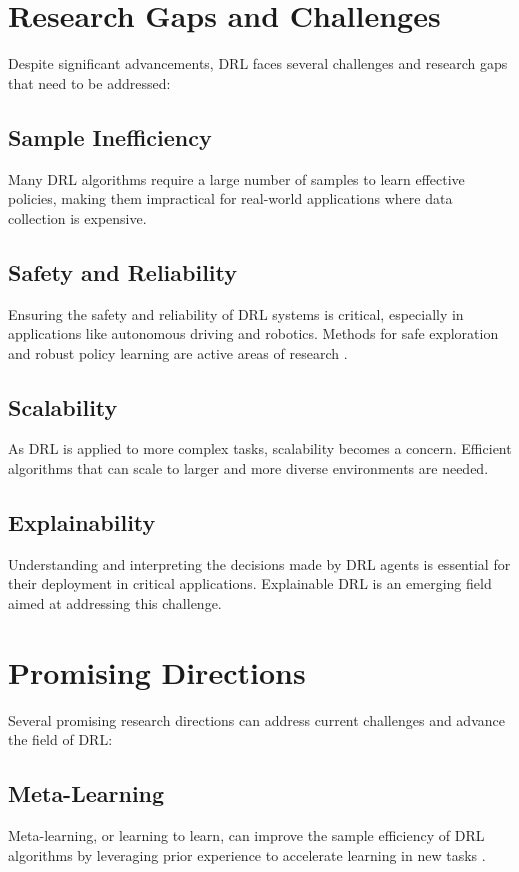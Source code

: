 \documentclass{article}
\begin{document}
\section{Research Gaps and Challenges}
Despite significant advancements, DRL faces several challenges and research gaps that need to be addressed:

\subsection{Sample Inefficiency}
Many DRL algorithms require a large number of samples to learn effective policies, making them impractical for real-world applications where data collection is expensive.

\subsection{Safety and Reliability}
Ensuring the safety and reliability of DRL systems is critical, especially in applications like autonomous driving and robotics. Methods for safe exploration and robust policy learning are active areas of research \cite{sharma2023deep}.

\subsection{Scalability}
As DRL is applied to more complex tasks, scalability becomes a concern. Efficient algorithms that can scale to larger and more diverse environments are needed.

\subsection{Explainability}
Understanding and interpreting the decisions made by DRL agents is essential for their deployment in critical applications. Explainable DRL is an emerging field aimed at addressing this challenge.

\section{Promising Directions}
Several promising research directions can address current challenges and advance the field of DRL:

\subsection{Meta-Learning}
Meta-learning, or learning to learn, can improve the sample efficiency of DRL algorithms by leveraging prior experience to accelerate learning in new tasks \cite{sharma2023deep}.
\end{document}
